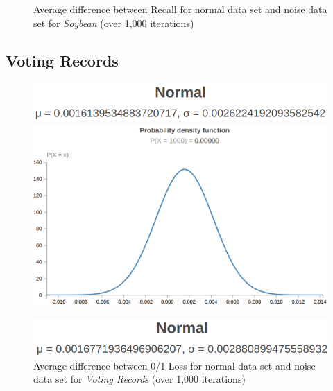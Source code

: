 \documentclass[twoside,11pt]{article}
\begin{document}
\begin{figure}[!hbp]
\begin{minipage}[b]{0.3\textwidth}
        \caption{Average difference between Recall for normal data set and noise data set for \emph{Soybean} (over 1,000 iterations)}
    \end{minipage}
\end{figure}

\subsection{Voting Records}

\begin{figure}[!hbp] %
    \centering
    \begin{minipage}[b]{0.3\textwidth}
        \includegraphics[width=\textwidth]{vr-l-ms.png}
        \includegraphics[width=\textwidth]{vr-l-df.png}
        \caption{Average difference between 0/1 Loss for normal data set and noise data set for \emph{Voting Records} (over 1,000 iterations)}
    \end{minipage}
    \hfill
    \begin{minipage}[b]{0.3\textwidth}
        \includegraphics[width=\textwidth]{vr-p-ms.png}

\end{minipage}
\end{figure}
\end{document}
